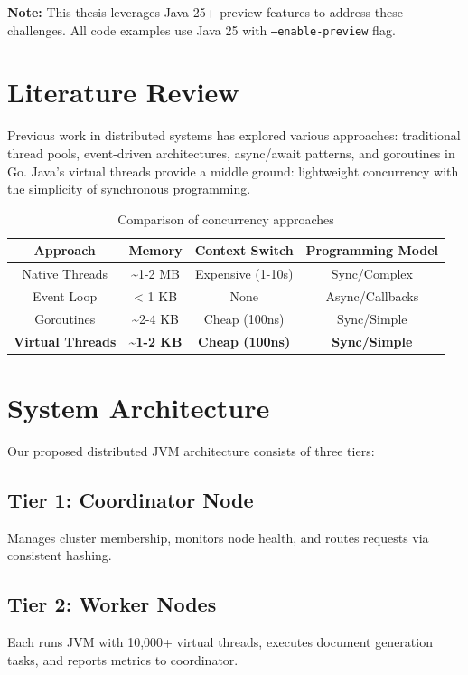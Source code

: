 \documentclass[12pt,a4paper]{article}
\begin{document}
\textbf{Note:} This thesis leverages Java 25+ preview features to address these challenges. All code examples use Java 25 with \texttt{--enable-preview} flag.

\section{Literature Review}

Previous work in distributed systems has explored various approaches: traditional thread pools, event-driven architectures, async/await patterns, and goroutines in Go. Java's virtual threads provide a middle ground: lightweight concurrency with the simplicity of synchronous programming.

\begin{table}[h]
\centering
\begin{tabular}{|c|c|c|c|}
\hline
\textbf{Approach} & \textbf{Memory} & \textbf{Context Switch} & \textbf{Programming Model} \\
\hline
Native Threads & \textasciitilde{}1-2 MB & Expensive (1-10\textmu{}s) & Sync/Complex \\
\hline
Event Loop & < 1 KB & None & Async/Callbacks \\
\hline
Goroutines & \textasciitilde{}2-4 KB & Cheap (100ns) & Sync/Simple \\
\hline
\textbf{Virtual Threads} & \textbf{\textasciitilde{}1-2 KB} & \textbf{Cheap (100ns)} & \textbf{Sync/Simple} \\
\hline
\end{tabular}
\caption{Comparison of concurrency approaches}
\label{tab:comparison}
\end{table}

\section{System Architecture}

Our proposed distributed JVM architecture consists of three tiers:

\subsection{Tier 1: Coordinator Node}
Manages cluster membership, monitors node health, and routes requests via consistent hashing.

\subsection{Tier 2: Worker Nodes}
Each runs JVM with 10,000+ virtual threads, executes document generation tasks, and reports metrics to coordinator.
\end{document}
